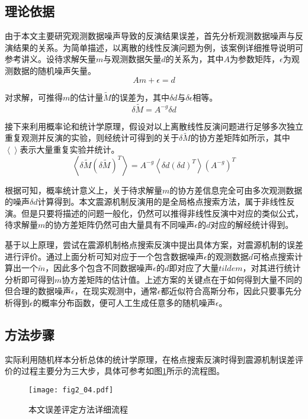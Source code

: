 \subsection{理论依据}
由于本文主要研究观测数据噪声导致的反演结果误差，首先分析观测数据噪声与反演结果的关系。为简单描述，以离散的线性反演问题为例，该案例详细推导说明可参考讲义。设待求解矢量$m$与观测数据矢量$d$的关系为，其中$A$为参数矩阵，$\epsilon$为观测数据的随机噪声矢量。
\begin{equation}
\label{eq2_17}
	Am+\epsilon=d
\end{equation}

对求解，可推得$m$的估计量$\tilde{M}$的误差为，其中${\delta}d$与${\delta}\epsilon$相等。
\begin{equation}
\label{eq2_18}
	\delta{\tilde{M}}=A^{-g}{\delta}d
\end{equation}

接下来利用概率论和统计学原理，假设对以上离散线性反演问题进行足够多次独立重复观测并反演的实验，则经统计可得到的关于$\delta{\tilde{M}}$的协方差矩阵如所示，其中$\left \langle \right \rangle$表示大量重复实验并统计。
\begin{equation}
\label{eq2_19}
	\left \langle \delta{\tilde{M}}(\delta{\tilde{M}})^T \right \rangle=
	A^{-g}\left \langle {\delta}d({\delta}d)^T \right \rangle  (A^{-g})^T
\end{equation}

根据可知，概率统计意义上，关于待求解量$m$的协方差信息完全可由多次观测数据的噪声${\delta}d$计算得到。本文震源机制反演用的是全局格点搜索方法，属于非线性反演。但是只要将描述的问题一般化，仍然可以推得非线性反演中对应的类似公式，待求解量$m$的协方差矩阵仍然可由大量具有不同噪声$\epsilon$的$d$对应的解经统计得到。

基于以上原理，尝试在震源机制格点搜索反演中提出具体方案，对震源机制的误差进行评价。通过上面分析可知对应于一个包含数据噪声$\epsilon$的观测数据$d$可格点搜索计算出一个$\tilde{m}$，因此多个包含不同数据噪声$\epsilon$的$d$即对应了大量$tilde{m}$，对其进行统计分析即可得到$m$协方差矩阵的估计值。上述方案的关键点在于如何得到大量不同的但合理的数据噪声$\epsilon$，在现实观测中，通常$\epsilon$都近似符合高斯分布，因此只要事先分析得到$\epsilon$的概率分布函数，便可人工生成任意多的随机噪声$\epsilon$。

\subsection{方法步骤}
实际利用随机样本分析总体的统计学原理，在格点搜索反演时得到震源机制误差评价的过程主要分为三大步，具体可参考如图\ref{fig2_04}所示的流程图。
\begin{figure}
\centering
  \texttt{[image: fig2\_04.pdf]} 
  \caption{本文误差评定方法详细流程}
  \label{fig2_04}
\end{figure}

